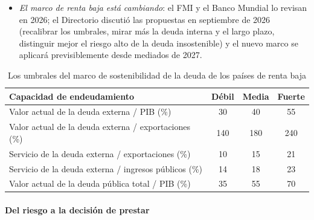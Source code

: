 \documentclass[11pt]{article}
\begin{document}
\begin{itemize}
\begin{enumerate}
  \item según cuántos umbrales se superen, y si es en el escenario base o solo en los de tensión, el riesgo de \emph{sobreendeudamiento} es bajo, moderado, alto o el país ya está \emph{en sobreendeudamiento} (con atrasos o reestructurando).
  \end{enumerate}
\item \emph{El marco de renta baja está cambiando}: el FMI y el Banco Mundial lo revisan en 2026; el Directorio discutió las propuestas en septiembre de 2026 (recalibrar los umbrales, mirar más la deuda interna y el largo plazo, distinguir mejor el riesgo alto de la deuda insostenible) y el nuevo marco se aplicará previsiblemente desde mediados de 2027\nocite{FMI2026LICDSFRevision}.
\end{itemize}

\begin{table}[H]
\centering\small
\caption{Los umbrales del marco de sostenibilidad de la deuda de los países de renta baja}\label{tab:umbrales-lic}
\begin{tabular}{lccc}
\toprule
\rowcolor{tceeazulpalido}
\textbf{Capacidad de endeudamiento} & \textbf{Débil} & \textbf{Media} & \textbf{Fuerte}\\
\midrule
Valor actual de la deuda externa / PIB (\%) & 30 & 40 & 55\\
Valor actual de la deuda externa / exportaciones (\%) & 140 & 180 & 240\\
Servicio de la deuda externa / exportaciones (\%) & 10 & 15 & 21\\
Servicio de la deuda externa / ingresos públicos (\%) & 14 & 18 & 23\\
\midrule
Valor actual de la deuda pública total / PIB (\%) & 35 & 55 & 70\\
\bottomrule
\end{tabular}
\end{table}

\paragraph{Del riesgo a la decisión de prestar}
\end{document}
